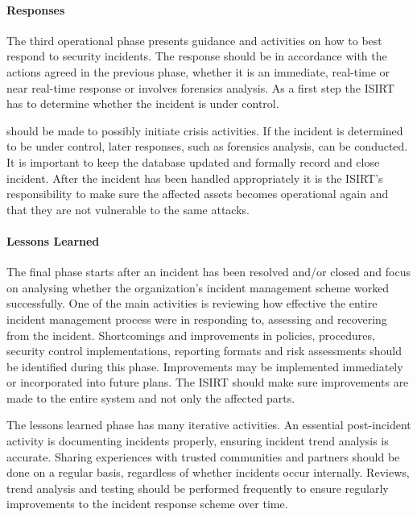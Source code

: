 \paragraph{Responses} The third operational phase presents guidance and activities on how to best respond to security incidents. The response should be in accordance with the actions agreed in the previous phase, whether it is an immediate, real-time or near real-time response or involves forensics analysis. As a first step the ISIRT has to determine whether the incident is under control.  




 should be made to possibly initiate crisis activities. If the incident is determined to be under control, later responses, such as forensics analysis, can be conducted. It is important to keep the database updated and formally record and close incident. After the incident has been handled appropriately it is the ISIRT's responsibility to make sure the affected assets becomes operational again and that they are not vulnerable to the same attacks. 


\paragraph{Lessons Learned} The final phase starts after an incident has been resolved and/or closed and focus on analysing whether the organization's incident management scheme worked successfully. One of the main activities is reviewing how effective the entire incident management process were in responding to, assessing and recovering from the incident. Shortcomings and improvements in policies, procedures, security control implementations, reporting formats and risk assessments should be identified during this phase. Improvements may be implemented immediately or incorporated into future plans. The ISIRT should make sure improvements are made to the entire system and not only the affected parts.

The lessons learned phase has many iterative activities. An essential post-incident activity is documenting incidents properly, ensuring incident trend analysis is accurate. Sharing experiences with trusted communities and partners should be done on a regular basis, regardless of whether incidents occur internally. Reviews, trend analysis and testing should be performed frequently to ensure regularly improvements to the incident response scheme over time. 




